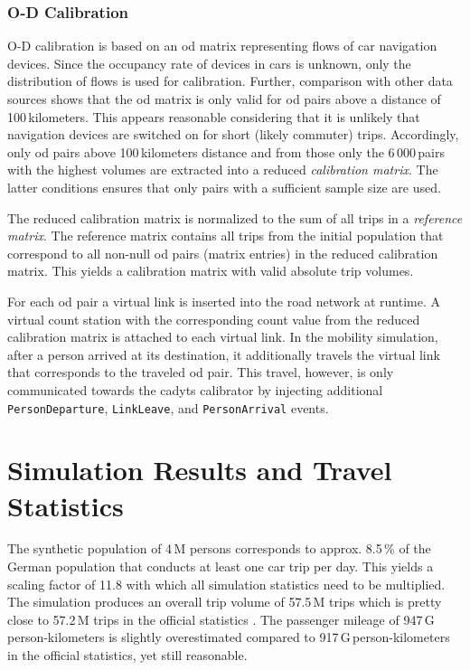 \subsubsection{O-D Calibration}

O-D calibration is based on an \gls{od} matrix representing flows of car navigation devices. Since the occupancy rate of devices in cars is unknown, only the distribution of flows is used for calibration. Further, comparison with other data sources shows that the \gls{od} matrix is only valid for \gls{od} pairs above a distance of 100\,kilometers. This appears reasonable considering that it is unlikely that navigation devices are switched on for short (likely commuter) trips. Accordingly, only \gls{od} pairs above 100\,kilometers distance and from those only the 6\,000\,pairs with the highest volumes are extracted into a reduced \emph{calibration matrix}. The latter conditions ensures that only pairs with a sufficient sample size are used.

The reduced calibration matrix is normalized to the sum of all trips in a \emph{reference matrix}. The reference matrix contains all trips from the initial population that correspond to all non-null \gls{od} pairs (matrix entries) in the reduced calibration matrix. This yields a calibration matrix with valid absolute trip volumes.

For each \gls{od} pair a virtual link is inserted into the road network at runtime. A virtual count station with the corresponding count value from the reduced calibration matrix is attached to each virtual link. In the mobility simulation, after a person arrived at its destination, it additionally travels the virtual link that corresponds to the traveled \gls{od} pair. This travel, however, is only communicated towards the \gls{cadyts} calibrator by injecting additional \lstinline|PersonDeparture|, \lstinline|LinkLeave|, and \lstinline|PersonArrival| events.

\section{Simulation Results and Travel Statistics}

The synthetic population of 4\,M persons corresponds to approx. 8.5\,\% of the German population that conducts at least one car trip per day. This yields a scaling factor of 11.8 with which all simulation statistics need to be multiplied. The simulation produces an overall trip volume of 57.5\,M trips which is pretty close to 57.2\,M trips in the official statistics \citep{DIW2014VerkehrInZahlen}. The passenger mileage of 947\,G\,person-kilometers is slightly overestimated compared to 917\,G\,person-kilometers in the official statistics, yet still reasonable.

